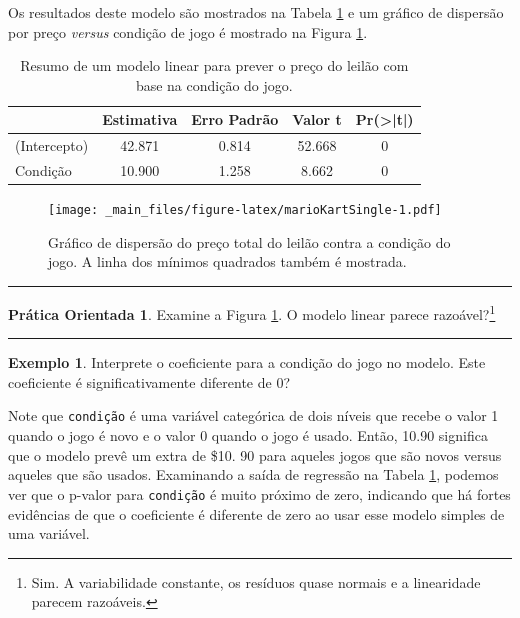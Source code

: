 \documentclass[
]{book}
\theoremstyle{definition}
\theoremstyle{definition}
\newtheorem{example}{Exemplo}[chapter]
\theoremstyle{definition}
\newtheorem{exercise}{Prática Orientada}[chapter]
\theoremstyle{definition}
\theoremstyle{remark}
\begin{document}
Os resultados deste modelo são mostrados na Tabela \ref{tab:singleVarModelsForPriceUsingCond} e um gráfico de dispersão por preço \emph{versus} condição de jogo é mostrado na Figura \ref{fig:marioKartSingle}.

\begin{table}

\caption{\label{tab:singleVarModelsForPriceUsingCond}Resumo de um modelo linear para prever o preço do leilão com base na condição do jogo.}
\centering
\begin{tabular}[t]{l|c|c|c|c}
\hline
  & Estimativa & Erro Padrão & Valor t & Pr(>|t|)\\
\hline
(Intercepto) & 42.871 & 0.814 & 52.668 & 0\\
\hline
Condição & 10.900 & 1.258 & 8.662 & 0\\
\hline
\end{tabular}
\end{table}

\begin{figure}
\centering
\texttt{[image: \_main\_files/figure-latex/marioKartSingle-1.pdf]}
\caption{\label{fig:marioKartSingle}Gráfico de dispersão do preço total do leilão contra a condição do jogo. A linha dos mínimos quadrados também é mostrada.}
\end{figure}

\begin{center}\rule{0.5\linewidth}{0.5pt}\end{center}

\begin{exercise}
\protect\hypertarget{exr:unnamed-chunk-285}{}{\label{exr:unnamed-chunk-285} }
Examine a Figura \ref{fig:marioKartSingle}. O modelo linear parece razoável?\footnote{Sim. A variabilidade constante, os resíduos quase normais e a linearidade parecem razoáveis.}
\end{exercise}

\begin{center}\rule{0.5\linewidth}{0.5pt}\end{center}

\begin{example}
\protect\hypertarget{exm:unnamed-chunk-286}{}{\label{exm:unnamed-chunk-286} }Interprete o coeficiente para a condição do jogo no modelo. Este coeficiente é significativamente diferente de 0?
\end{example}

Note que \texttt{condição} é uma variável categórica de dois níveis que recebe o valor 1 quando o jogo é novo e o valor 0 quando o jogo é usado. Então, 10.90 significa que o modelo prevê um extra de \$10. 90 para aqueles jogos que são novos versus aqueles que são usados. Examinando a saída de regressão na Tabela \ref{tab:singleVarModelsForPriceUsingCond}, podemos ver que o p-valor para \texttt{condição} é muito próximo de zero, indicando que há fortes evidências de que o coeficiente é diferente de zero ao usar esse modelo simples de uma variável.
\end{document}
